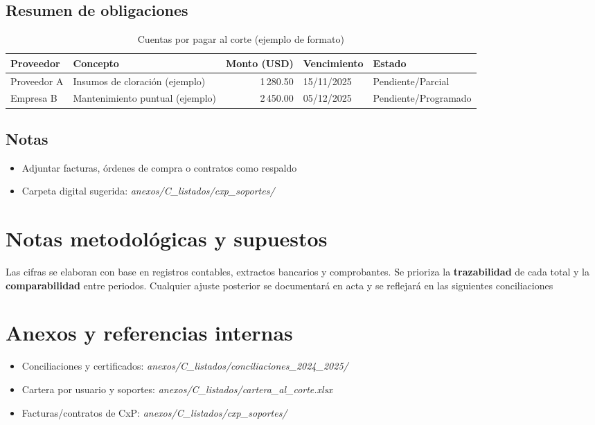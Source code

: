 \subsection*{Resumen de obligaciones}
\begin{table}[H]
\centering
\caption{Cuentas por pagar al corte (ejemplo de formato)}
\label{tab:cxp_resumen}
\begin{singlespace}
\begin{tabular}{p{3.2cm} p{6cm} r p{2.8cm} p{2.4cm}}
\toprule
\textbf{Proveedor} & \textbf{Concepto} & \textbf{Monto (USD)} & \textbf{Vencimiento} & \textbf{Estado} \\
\midrule
Proveedor A & Insumos de cloración (ejemplo) & 1\,280.50 & 15/11/2025 & Pendiente/Parcial \\
Empresa B & Mantenimiento puntual (ejemplo) & 2\,450.00 & 05/12/2025 & Pendiente/Programado \\
\bottomrule
\end{tabular}
\end{singlespace}
\end{table}

\subsection*{Notas}
\begin{itemize}
  \item Adjuntar facturas, órdenes de compra o contratos como respaldo
  \item Carpeta digital sugerida: \emph{anexos/C\_listados/cxp\_soportes/}
\end{itemize}

\section{Notas metodológicas y supuestos}
\label{sec:notas_metodologicas}

Las cifras se elaboran con base en registros contables, extractos bancarios y comprobantes. Se prioriza la \textbf{trazabilidad} de cada total y la \textbf{comparabilidad} entre periodos. Cualquier ajuste posterior se documentará en acta y se reflejará en las siguientes conciliaciones

\section{Anexos y referencias internas}
\label{sec:anexos_referencias}

\begin{itemize}
  \item Conciliaciones y certificados: \emph{anexos/C\_listados/conciliaciones\_2024\_2025/}
  \item Cartera por usuario y soportes: \emph{anexos/C\_listados/cartera\_al\_corte.xlsx}
  \item Facturas/contratos de CxP: \emph{anexos/C\_listados/cxp\_soportes/}
\end{itemize}
